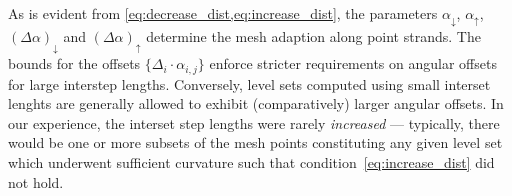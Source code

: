 

As is evident from \cref{eq:decrease_dist,eq:increase_dist}, the parameters
$\alpha_{\downarrow}$, $\alpha_{\uparrow}$, $(\Delta\alpha)_{\downarrow}$ and
$(\Delta\alpha)_{\uparrow}$ determine the mesh adaption along point strands.
The bounds for the offsets $\{\Delta_{i}\cdot\alpha_{i,j}\}$ enforce stricter
requirements on angular offsets for large interstep lengths. Conversely, level
sets computed using small interset lenghts are generally allowed to exhibit
(comparatively) larger angular offsets. In our experience, the interset step
lengths were rarely \emph{increased}  --- typically, there would be one or more
subsets of the mesh points constituting any given level set which underwent
sufficient curvature such that condition~\eqref{eq:increase_dist} did not hold.
